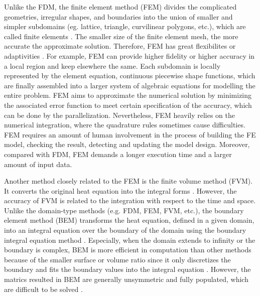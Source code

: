 Unlike the FDM, the finite element method
(FEM) \cite{zlamal1968finite} divides the complicated geometries,
irregular shapes, and boundaries into the union of smaller and simpler
subdomains (eg. lattice, triangle, curvilinear polygons, etc.), which
are called finite elements \cite{logan2011first}. The smaller size of
the finite element mesh, the more accurate the approximate
solution. Therefore, FEM has great flexibilites or
adaptivities \cite{reddy1993introduction}. For example, FEM can
provide higher fidelity or higher accuracy in a local region and keep
elsewhere the same. Each subdomain is locally represented by the
element equation, continuous piecewise shape functions, which are
finally assembled into a larger system of algebraic equations for
modelling the entire problem. FEM aims to approximate the numerical
solution by minimizing the associated error function to meet certain
specification of the accuracy, which can be done by the
parallelization. Nevertheless, FEM heavily relies on the numerical
integration, where the quadrature rules sometimes cause
difficulties. FEM requires an amount of human involvement in the
process of building the FE model, checking the result, detecting and
updating the model design. Moreover, compared with FDM, FEM demands a
longer execution time and a larger amount of input data.


Another method closely related to the FEM is the finite volume method
(FVM). It converts the original heat equation into the integral
forms \cite{eymard2000finite}. However, the accuracy of FVM is related
to the integration with respect to the time and space. Unlike the
domain-type methods (e.g. FDM, FEM, FVM, etc.), the boundary element
method (BEM) transforms the heat equation, defined in a given domain,
into an integral equation over the boundary of the domain using the
boundary integral equation
method \cite{attaway1991boundary}. Especially, when the domain extends
to infinity or the boundary is complex, BEM is more efficient in
computation than other methods because of the smaller surface or
volume ratio \cite{katsikadelis2002boundary} since it only discretizes
the boundary and fits the boundary values into the integral
equation \cite{ang2007beginner}. However, the matrics resulted in BEM
are generally unsymmetric and fully populated, which are difficult to
be solved \cite{mushtaq2010advantages}.


